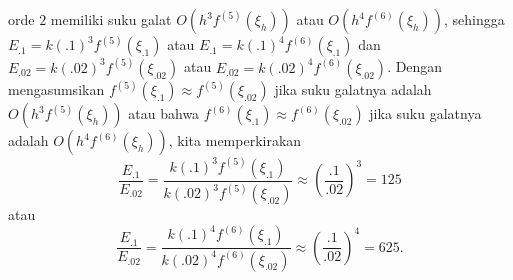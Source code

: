 \begin{description}
orde $2$ memiliki suku galat $O(h^{3}f^{(5)}(\xi_{h}))$ atau $O(h^{4}f^{(6)}(\xi_{h}))$,
sehingga $E_{.1}=k(.1)^{3}f^{(5)}(\xi_{.1})$ atau $E_{.1}=k(.1)^{4}f^{(6)}(\xi_{.1})$
dan $E_{.02}=k(.02)^{3}f^{(5)}(\xi_{.02})$ atau $E_{.02}=k(.02)^{4}f^{(6)}(\xi_{.02})$.
Dengan mengasumsikan $f^{(5)}(\xi_{.1})\approx f^{(5)}(\xi_{.02})$
jika suku galatnya adalah $O(h^{3}f^{(5)}(\xi_{h}))$ atau bahwa $f^{(6)}(\xi_{.1})\approx f^{(6)}(\xi_{.02})$
jika suku galatnya adalah $O(h^{4}f^{(6)}(\xi_{h}))$, kita memperkirakan
\[
\frac{E_{.1}}{E_{.02}}=\frac{k(.1)^{3}f^{(5)}(\xi_{.1})}{k(.02)^{3}f^{(5)}(\xi_{.02})}\approx\left(\frac{.1}{.02}\right)^{3}=125
\]
atau 
\[
\frac{E_{.1}}{E_{.02}}=\frac{k(.1)^{4}f^{(6)}(\xi_{.1})}{k(.02)^{4}f^{(6)}(\xi_{.02})}\approx\left(\frac{.1}{.02}\right)^{4}=625.
\]
\end{description}

